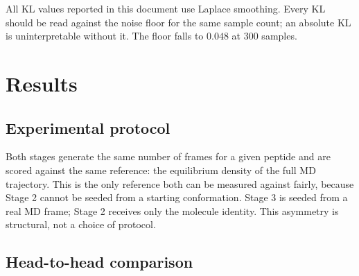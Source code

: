 \documentclass[11pt,a4paper]{article}
\begin{document}
All KL values reported in this document use Laplace smoothing. Every KL should
be read against the noise floor for the same sample count; an absolute KL is
uninterpretable without it. The floor falls to $0.048$ at 300 samples.

\section{Results}
\label{sec:results}

\subsection{Experimental protocol}
Both stages generate the same number of frames for a given peptide and are
scored against the same reference: the equilibrium density of the full MD
trajectory. This is the only reference both can be measured against fairly,
because Stage 2 cannot be seeded from a starting conformation. Stage 3 is
seeded from a real MD frame; Stage 2 receives only the molecule identity. This
asymmetry is structural, not a choice of protocol.

\subsection{Head-to-head comparison}
\end{document}
